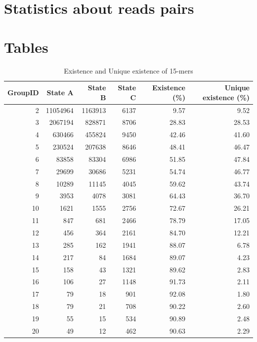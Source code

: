 \documentclass[11pt]{article}
\begin{document}
\section{Statistics about reads pairs}\label{pairs}

\clearpage

\appendix
\section{Tables}\label{append}

\begin{longtable}{r|r|r|r|r|r}
\caption{Existence and Unique existence of 15-mers}\\
\toprule
\textbf{GroupID} & \textbf{State A} & \textbf{State B} & \textbf{State C} & \textbf{Existence (\%)} & \textbf{Unique existence (\%)}\\
\midrule
\endhead
    2     & 11054964 & 1163913 & 6137  & 9.57 & 9.52 \\
    3     & 2067194 & 828871 & 8706  & 28.83 & 28.53 \\
    4     & 630466 & 455824 & 9450  & 42.46 & 41.60 \\
    5     & 230524 & 207638 & 8646  & 48.41 & 46.47 \\
    6     & 83858 & 83304 & 6986  & 51.85 & 47.84 \\
    7     & 29699 & 30686 & 5231  & 54.74 & 46.77 \\
    8     & 10289 & 11145 & 4045  & 59.62 & 43.74 \\
    9     & 3953  & 4078  & 3081  & 64.43 & 36.70 \\
    10    & 1621  & 1555  & 2756  & 72.67 & 26.21 \\
    11    & 847   & 681   & 2466  & 78.79 & 17.05 \\
    12    & 456   & 364   & 2161  & 84.70 & 12.21 \\
    13    & 285   & 162   & 1941  & 88.07 & 6.78 \\
    14    & 217   & 84    & 1684  & 89.07 & 4.23 \\
    15    & 158   & 43    & 1321  & 89.62 & 2.83 \\
    16    & 106   & 27    & 1148  & 91.73 & 2.11 \\
    17    & 79    & 18    & 901   & 92.08 & 1.80 \\
    18    & 79    & 21    & 708   & 90.22 & 2.60 \\
    19    & 55    & 15    & 534   & 90.89 & 2.48 \\
    20    & 49    & 12    & 462   & 90.63 & 2.29 \\

\end{longtable}
\end{document}
